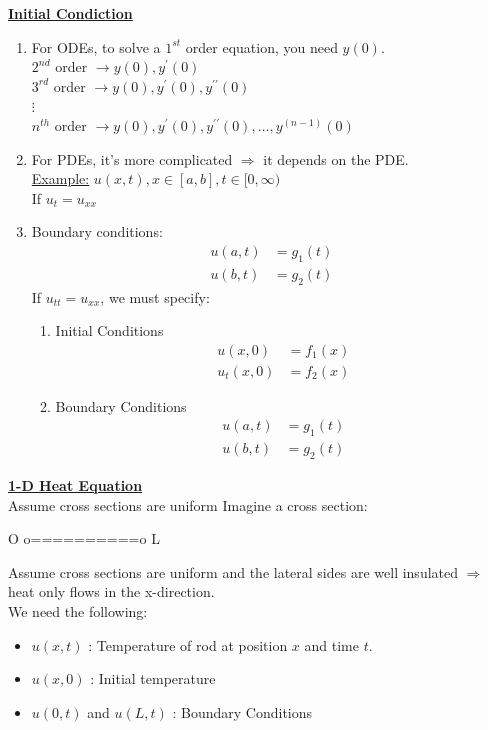 \documentclass{article}
\newcommand{\topic}[1]{\textbf{\underline{#1}}}
\newcommand{\Ex}{\underline{Example:} }
\begin{document}
\topic{Initial Condiction}
\begin{enumerate}
  \item For ODEs, to solve a $1^{st}$ order equation, you need $y(0)$.\\
  $2^{nd}$ order $\rightarrow y(0), y^\prime(0)$\\
  $3^{rd}$ order $\rightarrow y(0), y^\prime(0), y^{\prime\prime}(0)$\\
  $\vdots$\\
  $n^{th}$ order $\rightarrow y(0), y^\prime(0), y^{\prime\prime}(0), \ldots, y^{(n - 1)}(0)$
  \item For PDEs, it's more complicated $\Rightarrow$ it depends on the PDE.\\
  \Ex $u(x, t), x \in [a, b], t \in [0, \infty)$\\
  If $u_t = u_{xx}$
  \item Boundary conditions:
  \begin{align}
    u(a, t) & = g_1(t)\\
    u(b, t) & = g_2(t)
  \end{align}
  If $u_{tt} = u_{xx}$, we must specify:
  \begin{enumerate}
    \item Initial Conditions
    \begin{align}
      u(x, 0) & = f_1(x)\\
      u_t(x, 0) & = f_2(x)
    \end{align}
    \item Boundary Conditions
    \begin{align}
      u(a, t) & = g_1(t)\\
      u(b, t) & = g_2(t)
    \end{align}
  \end{enumerate}
\end{enumerate}
\topic{1-D Heat Equation}\\
Assume cross sections are uniform
Imagine a cross section:
\begin{center}
  O o==========o L
\end{center}
Assume cross sections are uniform and the lateral sides are well insulated $\Rightarrow$ heat only flows in the x-direction.\\
We need the following:
\begin{itemize}
  \item $u(x, t)$ : Temperature of rod at position $x$ and time $t$.
  \item $u(x, 0)$ : Initial temperature
  \item $u(0, t)$ and $u(L, t)$ : Boundary Conditions
\end{itemize}
\end{document}
